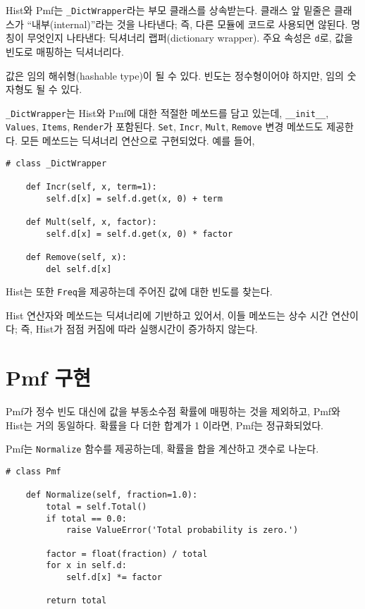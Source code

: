 Hist와 Pmf는 \verb"_DictWrapper"라는 부모 클래스를 상속받는다.
클래스 앞 밑줄은 클래스가 ``내부(internal)''라는 것을 나타낸다; 즉,
다른 모듈에 코드로 사용되면 않된다. 명칭이 무엇인지 나타낸다: 
딕셔너리 랩퍼(dictionary wrapper). 
주요 속성은 {\tt d}로, 값을 빈도로 매핑하는 딕셔너리다.


값은 임의 해쉬형(hashable type)이 될 수 있다.
빈도는 정수형이어야 하지만, 임의 숫자형도 될 수 있다.

\verb"_DictWrapper"는 Hist와 Pmf에 대한 적절한 메쏘드를 담고 있는데,
\verb"__init__", {\tt Values}, {\tt Items}, {\tt Render}가 포함된다.
{\tt Set}, {\tt Incr}, {\tt Mult}, {\tt Remove} 변경 메쏘드도 제공한다.
모든 메쏘드는 딕셔너리 연산으로 구현되었다. 예를 들어,

\begin{verbatim}
# class _DictWrapper

    def Incr(self, x, term=1):
        self.d[x] = self.d.get(x, 0) + term

    def Mult(self, x, factor):
        self.d[x] = self.d.get(x, 0) * factor

    def Remove(self, x):
        del self.d[x]
\end{verbatim}

Hist는 또한 {\tt Freq}을 제공하는데 주어진 값에 대한 빈도를 찾는다.

Hist 연산자와 메쏘드는 딕셔너리에 기반하고 있어서, 
이들 메쏘드는 상수 시간 연산이다; 즉, Hist가 점점 커짐에 따라 실행시간이 증가하지 않는다.


\section{Pmf 구현}
Pmf가 정수 빈도 대신에 값을 부동소수점 확률에 매핑하는 것을 제외하고, 
Pmf와 Hist는 거의 동일하다.
확률을 다 더한 합계가 1 이라면, Pmf는 정규화되었다.

Pmf는 {\tt Normalize} 함수를 제공하는데, 확률을 합을 계산하고 갯수로 나눈다.

\begin{verbatim}
# class Pmf

    def Normalize(self, fraction=1.0):
        total = self.Total()
        if total == 0.0:
            raise ValueError('Total probability is zero.')

        factor = float(fraction) / total
        for x in self.d:
            self.d[x] *= factor

        return total
\end{verbatim}

